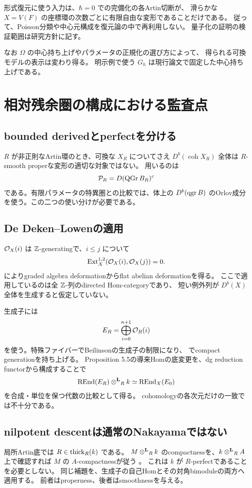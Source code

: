 形式復元に使う入力は、\(\hbar=0\) での完備化の各Artin切断が、
滑らかな \(X=V(F)\) の座標環の次数ごとに有限自由な変形であることだけである。
従って、Poisson分類や中心元構成を復元論の中で再利用しない。
量子化の証明の検証範囲は研究方針に記す。

なお \(\Omega\) の中心持ち上げやパラメータの正規化の選び方によって、
得られる可換モデルの表示は変わり得る。
明示例で使う \(G_h\) は現行論文で固定した中心持ち上げである。

\section{相対残余圏の構成における監査点}

\subsection{bounded derivedとperfectを分ける}

\(R\) が非正則なArtin環のとき、可換な \(X_R\) についてさえ
\(D^b(\operatorname{coh}X_R)\) 全体は \(R\)-smooth properな変形の適切な対象ではない。
用いるのは
\[
 \mathcal P_R=D(\operatorname{QGr} B_R)^c
\]
である。有限パラメータの特異圏との比較では、体上の
\(D^b(\operatorname{qgr} B)\) のOrlov成分を使う。この二つの使い分けが必要である。

\subsection{De Deken--Lowenの適用}

\(\mathcal O_X(i)\) は \(\mathbb Z\)-generatingで、\(i\le j\) について
\[
 \operatorname{Ext}_X^{1,2}(\mathcal O_X(i),\mathcal O_X(j))=0.
\]
\cite[Theorem 4.5]{DDL} によりgraded algebra deformationからflat abelian deformationを得る。
ここで適用しているのは全 \(\mathbb Z\)-列のdirected Hom-categoryであり、
短い例外列が \(D^b(X)\) 全体を生成すると仮定していない。

生成子には
\[
 E_R=\bigoplus_{i=0}^{n+1}\mathcal O_R(i)
\]
を使う。特殊ファイバーでBeilinsonの生成子の制限になり、
\cite[Propositions 5.8--5.9]{DDL} でcompact generationを持ち上げる。
Proposition 5.5の導来Homの底変更を、dg reduction functorから構成することで
\[
 \operatorname{REnd}(E_R)\mathbin{\otimes^{\mathbf L}}_Rk\simeq\operatorname{REnd}_X(E_0)
\]
を合成・単位を保つ代数の比較として得る。
cohomologyの各次元だけの一致では不十分である。

\subsection{nilpotent descentは通常のNakayamaではない}

局所Artin底では \(R\in\operatorname{thick}_R(k)\) である。
\(M\mathbin{\otimes^{\mathbf L}}_Rk\) のcompactnessを、\(k\mathbin{\otimes^{\mathbf L}}_R A\) 上で確認すれば
\(M\) の \(A\)-compactnessが従う \cite{Mathew}。
これは \(k\) が \(R\)-perfectであることを必要としない。
同じ補題を、生成子の自己Homとその対角bimoduleの両方へ適用する。
前者はproperness、後者はsmoothnessを与える。

